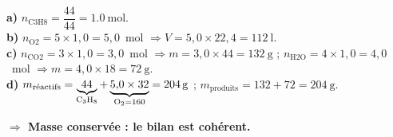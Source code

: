 \documentclass[11pt,a4paper]{article}
\newcommand{\nq}[1]{n_{\text{#1}}}
\newcommand{\rep}[1]{\par\smallskip\noindent\textbf{\color{corrcol}$\Rightarrow$ #1}}
\begin{document}
\begin{cor}
\textbf{a)} $\nq{C3H8}=\dfrac{44}{44}=\SI{1,0}{\mole}$.\\
\textbf{b)} $\nq{O2}=5\times1{,}0=5{,}0$~mol $\Rightarrow V=5{,}0\times22{,}4=\boxed{\SI{112}{\litre}}$.\\
\textbf{c)} $\nq{CO2}=3\times1{,}0=3{,}0$~mol $\Rightarrow m=3{,}0\times44=\boxed{\SI{132}{\gram}}$ ;\quad
$\nq{H2O}=4\times1{,}0=4{,}0$~mol $\Rightarrow m=4{,}0\times18=\boxed{\SI{72}{\gram}}$.\\
\textbf{d)} $m_{\text{réactifs}}=\underbrace{44}_{\ce{C3H8}}+\underbrace{5{,}0\times32}_{\ce{O2}=160}=\SI{204}{\gram}$ ;\quad
$m_{\text{produits}}=132+72=\SI{204}{\gram}$. \checkmark
\rep{Masse conservée : le bilan est cohérent.}
\end{cor}
\end{document}
